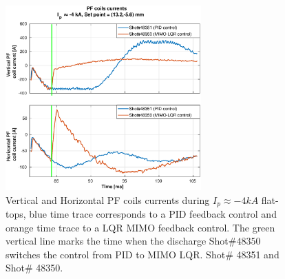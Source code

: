 \begin{figure}
	\centering
	\includegraphics[width=0.67\textwidth]{Chp5/PIDvsMIMO_351_350_curr_2.eps}
	\caption{Vertical and Horizontal PF coils currents during  $I_p\approx -4kA$  flat-tops, blue time trace corresponds to a PID feedback control and orange time trace to a LQR MIMO feedback control. The green vertical line marks the time  when the  discharge Shot$\# 48350$ switches the control from PID to MIMO LQR.  Shot$\#$ 48351 and Shot$\#$ 48350.}
\end{figure}